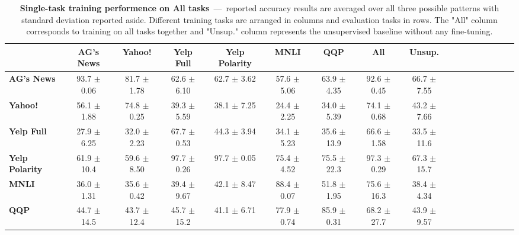 \begin{table*}[h]
	\centering
	\fontsize{9}{13}
	\selectfont
	\begin{tabular*}{\textwidth}{l@{\extracolsep{\fill}}cccccccccccccccc}
		\toprule
		& \textbf{AG's News}    & \textbf{Yahoo!}    & \textbf{Yelp Full}    & \textbf{Yelp Polarity}    & \textbf{MNLI}    & \textbf{QQP}    & \textbf{All}    & \textbf{Unsup.}    \\ \hline
		\textbf{AG's News}        & 93.7   \tiny$\pm$ 0.06      & 81.7   \tiny$\pm$ 1.78      & 62.6      \tiny$\pm$ 6.10      & 62.7          \tiny$\pm$ 3.62      & 57.6 \tiny$\pm$ 5.06      & 63.9 \tiny$\pm$ 4.35      & 92.6 \tiny$\pm$ 0.45      & 66.7   \tiny$\pm$ 7.55      \\
		\textbf{Yahoo!}         & 56.1    \tiny$\pm$ 1.88      & 74.8   \tiny$\pm$ 0.25      & 39.3       \tiny$\pm$ 5.59      & 38.1           \tiny$\pm$ 7.25      & 24.4  \tiny$\pm$ 2.25      & 34.0 \tiny$\pm$ 5.39      & 74.1 \tiny$\pm$ 0.68      & 43.2   \tiny$\pm$ 7.66      \\
		\textbf{Yelp Full}     & 27.9    \tiny$\pm$ 6.25      & 32.0   \tiny$\pm$ 2.23      & 67.7       \tiny$\pm$ 0.53      & 44.3           \tiny$\pm$ 3.94      & 34.1  \tiny$\pm$ 5.23      & 35.6 \tiny$\pm$ 13.9      & 66.6 \tiny$\pm$ 1.58      & 33.5   \tiny$\pm$ 11.6      \\
		\textbf{Yelp Polarity} & 61.9    \tiny$\pm$ 10.4      & 59.6   \tiny$\pm$ 8.50      & 97.7       \tiny$\pm$ 0.26      & 97.7           \tiny$\pm$ 0.05      & 75.4  \tiny$\pm$ 4.52      & 75.5 \tiny$\pm$ 22.3      & 97.3 \tiny$\pm$ 0.29      & 67.3   \tiny$\pm$ 15.7      \\
		\textbf{MNLI}          & 36.0    \tiny$\pm$ 1.31      & 35.6   \tiny$\pm$ 0.42      & 39.4       \tiny$\pm$ 9.67      & 42.1           \tiny$\pm$ 8.47      & 88.4  \tiny$\pm$ 0.07      & 51.8 \tiny$\pm$ 1.95      & 75.6 \tiny$\pm$ 16.3      & 38.4   \tiny$\pm$ 4.34      \\
		\textbf{QQP}           & 44.7    \tiny$\pm$ 14.5      & 43.7   \tiny$\pm$ 12.4      & 45.7       \tiny$\pm$ 15.2      & 41.1           \tiny$\pm$ 6.71      & 77.9  \tiny$\pm$ 0.74      & 85.9 \tiny$\pm$ 0.31      & 68.2 \tiny$\pm$ 27.7      & 43.9   \tiny$\pm$ 9.57      \\ \bottomrule
	\end{tabular*}
	\caption{\textbf{Single-task training performence on All tasks}~---~reported accuracy results are averaged over all three possible patterns with standard deviation reported aside. Different training tasks are arranged in columns and evaluation tasks in rows. The "All" column corresponds to training on all tasks together and "Unsup." column represents the unsupervised baseline without any fine-tuning.}\label{tab:single-on-train-set-summary}
	\vspace{-4mm}
\end{table*}
